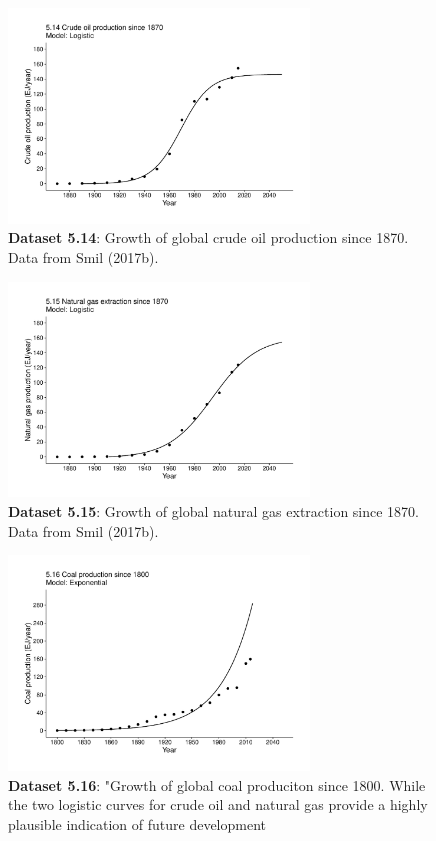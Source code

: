 \documentclass[aps,rmp,preprint,superscriptaddress,10pt,onecolumn]{article}
\begin{document}
\begin{figure}[h]
\includegraphics[width=8cm]{output/figs-ggplot/5.14.pdf}
\caption{\textbf{Dataset 5.14}: Growth of global crude oil production since 1870. Data from Smil (2017b).}
\end{figure}
	
\begin{figure}[h]
\includegraphics[width=8cm]{output/figs-ggplot/5.15.pdf}
\caption{\textbf{Dataset 5.15}: Growth of global natural gas extraction since 1870. Data from Smil (2017b).}
\end{figure}
	
\begin{figure}[h]
\includegraphics[width=8cm]{output/figs-ggplot/5.16.pdf}
\caption{\textbf{Dataset 5.16}: "Growth of global coal produciton since 1800. While the two logistic curves for crude oil and natural gas provide a highly plausible indication of future development}
\end{figure}
	
\end{document}
